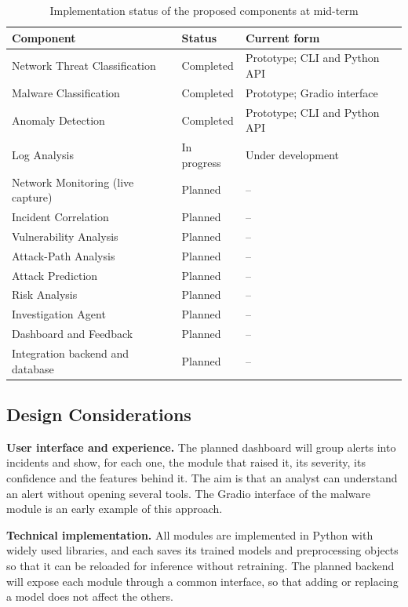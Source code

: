 \begin{table}[H]
\centering
\caption{Implementation status of the proposed components at mid-term}
\label{tab:status}
\small
\begin{tabular}{lll}
\toprule
\textbf{Component} & \textbf{Status} & \textbf{Current form} \\
\midrule
Network Threat Classification & Completed & Prototype; CLI and Python API \\
Malware Classification & Completed & Prototype; Gradio interface \\
Anomaly Detection & Completed & Prototype; CLI and Python API \\
Log Analysis & In progress & Under development \\
Network Monitoring (live capture) & Planned & -- \\
Incident Correlation & Planned & -- \\
Vulnerability Analysis & Planned & -- \\
Attack-Path Analysis & Planned & -- \\
Attack Prediction & Planned & -- \\
Risk Analysis & Planned & -- \\
Investigation Agent & Planned & -- \\
Dashboard and Feedback & Planned & -- \\
Integration backend and database & Planned & -- \\
\bottomrule
\end{tabular}
\end{table}

\subsection{Design Considerations}

\textbf{User interface and experience.} The planned dashboard will group alerts into incidents and show, for each one, the module that raised it, its severity, its confidence and the features behind it. The aim is that an analyst can understand an alert without opening several tools. The Gradio interface of the malware module is an early example of this approach.

\textbf{Technical implementation.} All modules are implemented in Python with widely used libraries, and each saves its trained models and preprocessing objects so that it can be reloaded for inference without retraining. The planned backend will expose each module through a common interface, so that adding or replacing a model does not affect the others.

